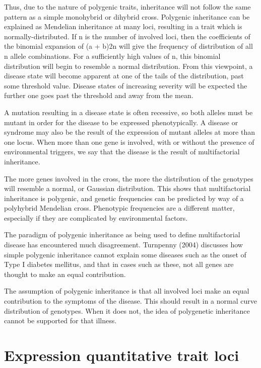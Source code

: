 Thus, due to the nature of polygenic traits, inheritance will not follow the same pattern as a simple monohybrid or dihybrid cross. Polygenic inheritance can be explained as Mendelian inheritance at many loci, resulting in a trait which is normally-distributed. If n is the number of involved loci, then the coefficients of the binomial expansion of (a + b)2n will give the frequency of distribution of all n allele combinations. For a sufficiently high values of n, this binomial distribution will begin to resemble a normal distribution. From this viewpoint, a disease state will become apparent at one of the tails of the distribution, past some threshold value. Disease states of increasing severity will be expected the further one goes past the threshold and away from the mean.

A mutation resulting in a disease state is often recessive, so both alleles must be mutant in order for the disease to be expressed phenotypically. A disease or syndrome may also be the result of the expression of mutant alleles at more than one locus. When more than one gene is involved, with or without the presence of environmental triggers, we say that the disease is the result of multifactorial inheritance.

The more genes involved in the cross, the more the distribution of the genotypes will resemble a normal, or Gaussian distribution. This shows that multifactorial inheritance is polygenic, and genetic frequencies can be predicted by way of a polyhybrid Mendelian cross. Phenotypic frequencies are a different matter, especially if they are complicated by environmental factors.

The paradigm of polygenic inheritance as being used to define multifactorial disease has encountered much disagreement. Turnpenny (2004) discusses how simple polygenic inheritance cannot explain some diseases such as the onset of Type I diabetes mellitus, and that in cases such as these, not all genes are thought to make an equal contribution.

The assumption of polygenic inheritance is that all involved loci make an equal contribution to the symptoms of the disease. This should result in a normal curve distribution of genotypes. When it does not, the idea of polygenetic inheritance cannot be supported for that illness.

\hypertarget{expression-quantitative-trait-loci}{%
\section{Expression quantitative trait loci}\label{expression-quantitative-trait-loci}}

